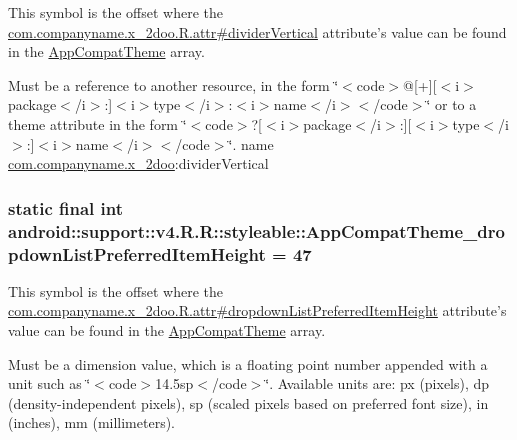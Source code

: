 This symbol is the offset where the \hyperlink{classcom_1_1companyname_1_1x__2doo_1_1_r_1_1attr_06c17383ffb44b4e812f6d4f186c37af}{com.companyname.x\_\-2doo.R.attr\#dividerVertical} attribute's value can be found in the \hyperlink{classandroid_1_1support_1_1v4_1_1_r_1_1styleable_0873e92ba21076bb5a4aeadeb7f5779f}{AppCompatTheme} array.

Must be a reference to another resource, in the form \char`\"{}$<$code$>$@\mbox{[}+\mbox{]}\mbox{[}$<$i$>$package$<$/i$>$:\mbox{]}$<$i$>$type$<$/i$>$:$<$i$>$name$<$/i$>$$<$/code$>$\char`\"{} or to a theme attribute in the form \char`\"{}$<$code$>$?\mbox{[}$<$i$>$package$<$/i$>$:\mbox{]}\mbox{[}$<$i$>$type$<$/i$>$:\mbox{]}$<$i$>$name$<$/i$>$$<$/code$>$\char`\"{}.  name \hyperlink{namespacecom_1_1companyname_1_1x__2doo}{com.companyname.x\_\-2doo}:dividerVertical \hypertarget{classandroid_1_1support_1_1v4_1_1_r_1_1styleable_a0ae883a1cfc49924dd71cb9014f35b6}{
\subsubsection[{AppCompatTheme\_\-dropdownListPreferredItemHeight}]{\setlength{\rightskip}{0pt plus 5cm}static final int android::support::v4.R.R::styleable::AppCompatTheme\_\-dropdownListPreferredItemHeight = 47}}
\label{classandroid_1_1support_1_1v4_1_1_r_1_1styleable_a0ae883a1cfc49924dd71cb9014f35b6}


This symbol is the offset where the \hyperlink{classcom_1_1companyname_1_1x__2doo_1_1_r_1_1attr_c9b423ffc7a18773181edea893e59ad2}{com.companyname.x\_\-2doo.R.attr\#dropdownListPreferredItemHeight} attribute's value can be found in the \hyperlink{classandroid_1_1support_1_1v4_1_1_r_1_1styleable_0873e92ba21076bb5a4aeadeb7f5779f}{AppCompatTheme} array.

Must be a dimension value, which is a floating point number appended with a unit such as \char`\"{}$<$code$>$14.5sp$<$/code$>$\char`\"{}. Available units are: px (pixels), dp (density-independent pixels), sp (scaled pixels based on preferred font size), in (inches), mm (millimeters). 

